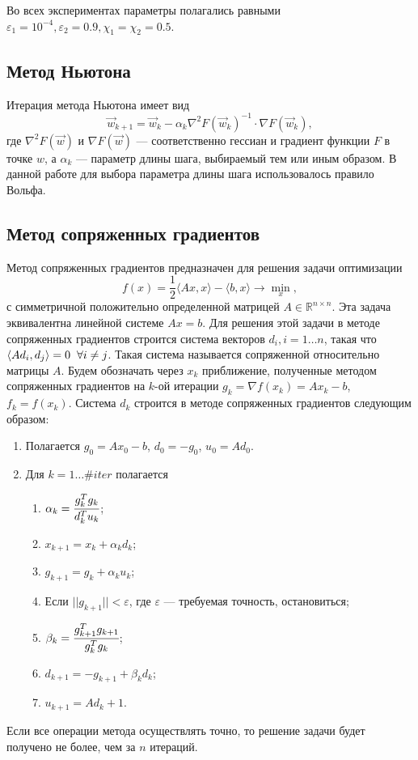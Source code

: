 \documentclass[12pt]{article}
\begin{document}
		Во всех экспериментах параметры полагались равными $\varepsilon_1 = 10^{-4}, \varepsilon_2 = 0.9, \chi_1 = \chi_2 = 0.5$.
		
		\subsection{Метод Ньютона}
		
		\hspace{0.6cm} Итерация метода Ньютона имеет вид 
		$$ \vec w_{k+1} = \vec w_k - \alpha_k \nabla^2 F(\vec w_k)^{-1}\cdot \nabla F(\vec w_k),$$
		где $\nabla^2 F(\vec w)$ и $\nabla F(\vec w)$ — соответственно гессиан и градиент функции $F$ в точке $w$, а $\alpha_k$ — параметр длины шага, выбираемый тем или иным образом. В данной работе для выбора параметра длины шага использовалось правило Вольфа.	
	
	\subsection{Метод сопряженных градиентов}
	
		\hspace{0.6cm}Метод сопряженных градиентов предназначен для решения задачи оптимизации
		$$f(x) = \frac 1 2 \langle A x, x \rangle  - \langle b, x\rangle \rightarrow \min\limits_{x},$$
		с симметричной положительно определенной матрицей  $A \in \mathbb{R}^{n \times n}$. Эта задача эквивалентна линейной системе $Ax = b$. Для решения этой задачи в методе сопряженных градиентов строится система векторов $d_i, i = 1 \ldots n$, такая что $\langle A d_i, d_j \rangle = 0 \hspace{0.2cm} \forall i \ne j$. Такая система называется сопряженной относительно матрицы $A$. Будем обозначать через $x_k$ приближение, полученные методом сопряженных градиентов на $k$-ой итерации $g_k = \nabla f(x_k) = A x_k - b$, $f_k = f(x_k)$. Система $d_k$ строится в методе сопряженных градиентов следующим образом: 
		\begin{enumerate}
			\item Полагается $g_0 = Ax_0 - b$, $d_0 = -g_0$, $u_0 = A d_0$.
			\item Для $k = 1 \ldots \#iter$ полагается
			\begin{enumerate}
				\item $\alpha_k = \cfrac{g_k^T g_k} {d_k^T u_k}$;
				\item $x_{k + 1} = x_k + \alpha_k d_k$;
				\item $g_{k+1} = g_k + \alpha_k u_k$;
				\item Если $|| g_{k+1}|| < \varepsilon$,  где $\varepsilon$ — требуемая точность, остановиться;
				\item  $\beta_{k} = \cfrac{g_{k+1}^T g_{k+1}} {g_k^T g_k}$;
				\item $d_{k+1} = -g_{k+1} + \beta_{k}d_{k}$;
				\item $u_{k+1} = A d_k+1$.
			\end{enumerate}
		\end{enumerate}
		Если все операции метода осуществлять точно, то решение задачи будет получено не более, чем за $n$ итераций.
	
\end{document}

